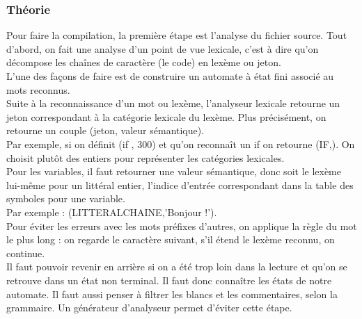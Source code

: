 \subsubsection{Théorie}
Pour faire la compilation, la première étape est l'analyse du fichier source.
Tout d'abord, on fait une analyse d'un point de vue lexicale, c'est à dire qu'on décompose les chaînes de caractère (le code) en lexème ou jeton.\\
L'une des façons de faire est de construire un automate à état fini associé au mots reconnus.\\
Suite à la reconnaissance d'un mot ou lexème, l'analyseur lexicale retourne un jeton correspondant  à la catégorie lexicale du lexème. Plus précisément, on retourne un couple (jeton, valeur sémantique).\\
Par exemple, si on définit  (if , 300) et qu'on reconnaît un if on retourne (IF,).
On choisit plutôt des entiers pour représenter les catégories lexicales.\\
Pour les variables, il faut retourner une valeur sémantique, donc soit le lexème lui-même pour un littéral entier, l'indice d'entrée correspondant dans la table des symboles pour une variable.\\
Par exemple : (LITTERALCHAINE,'Bonjour !').\\
Pour éviter les erreurs avec les mots préfixes d'autres, on applique la règle du mot le plus long : on regarde le caractère suivant, s'il étend le lexème reconnu, on continue.\\
Il faut pouvoir revenir en arrière si on a été trop loin dans la lecture et qu'on se retrouve dans un état non terminal. Il faut donc connaître les états de notre automate.
Il faut aussi penser à filtrer les blancs et les commentaires, selon la grammaire.
Un générateur d'analyseur permet d'éviter cette étape.\\

